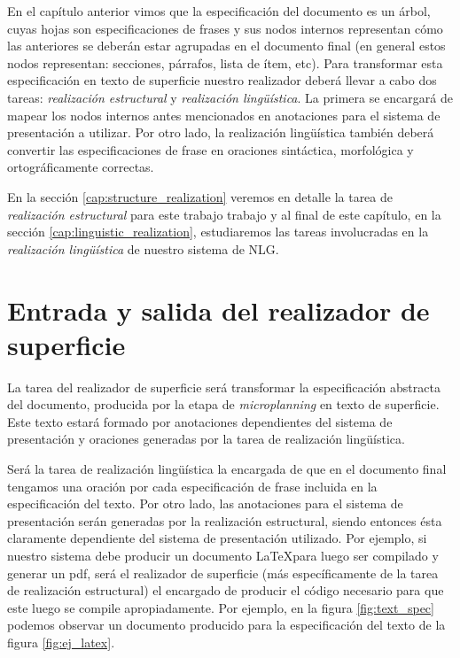 En el capítulo anterior vimos que la especificación del documento es un árbol, cuyas hojas son especificaciones de frases y sus nodos internos representan cómo las anteriores se deberán estar agrupadas en el documento final (en general estos nodos representan: secciones, párrafos, lista de ítem, etc). Para transformar esta especificación en texto de superficie nuestro realizador deberá llevar a cabo dos tareas: \emph{realización estructural} y \emph{realización lingüística}. La primera se encargará de mapear los nodos internos antes mencionados en anotaciones para el sistema de presentación a utilizar. Por otro lado, la realización lingüística también deberá convertir las especificaciones de frase en oraciones sintáctica, morfológica y ortográficamente correctas.

En la sección \ref{cap:structure_realization} veremos en detalle la tarea de \emph{realización estructural} para este trabajo trabajo y al final de este capítulo, en la sección \ref{cap:linguistic_realization}, estudiaremos las tareas involucradas en la \emph{realización lingüística} de nuestro sistema de NLG.

\section{Entrada y salida del realizador de superficie}

La tarea del realizador de superficie será transformar la especificación abstracta del documento, producida por la etapa de \textit{microplanning} en texto de superficie. Este texto estará formado por anotaciones dependientes del sistema de presentación y oraciones generadas por la tarea de realización lingüística.

Será la tarea de realización lingüística la encargada de que en el documento final tengamos una oración por cada especificación de frase incluida en la especificación del texto. Por otro lado, las anotaciones para el sistema de presentación serán generadas por la realización estructural, siendo entonces ésta claramente dependiente del sistema de presentación utilizado. Por ejemplo, si nuestro sistema debe producir un documento \LaTeX para luego ser compilado y generar un pdf, será el realizador de superficie (más específicamente de la tarea de realización estructural) el encargado de producir el código necesario para que este luego se compile apropiadamente. Por ejemplo, en la figura \ref{fig:text_spec} podemos observar un documento producido para la especificación del texto de la figura \ref{fig:ej_latex}.

